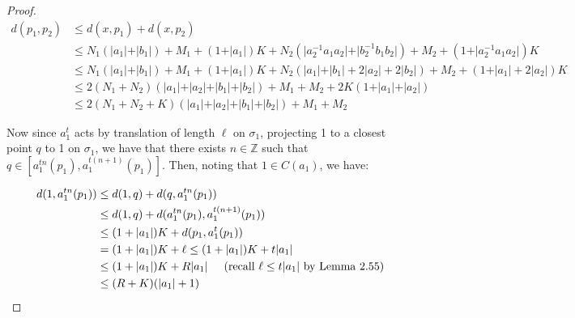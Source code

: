 \documentclass[12pt]{article}
\newcommand{\vs}{\vskip10pt}
\begin{document}
\begin{proof}
		\begin{align*}
		d(p_1, p_2) &\leq d(x, p_1) + d(x, p_2) \\
		&\leq N_1 (\vert a_1 \vert + \vert b_1 \vert) + M_1 + (1 + \vert a_1 \vert)K + N_2 (\vert a_2^{-1} a_1 a_2 \vert + \vert b_2^{-1} b_1 b_2 \vert) + M_2 + (1 + \vert a_2 ^{-1} a_1 a_2 \vert)K \\
		&\leq N_1 (\vert a_1 \vert + \vert b_1 \vert) + M_1 + (1 + \vert a_1 \vert)K + N_2 (\vert a_1 \vert + \vert b_1 \vert + 2 \vert a_2 \vert + 2 \vert b_2 \vert) + M_2 + (1 + \vert a_1 \vert + 2 \vert a_2 \vert)K \\
		&\leq 2(N_1 + N_2) (\vert a_1 \vert + \vert a_2 \vert + \vert b_1 \vert + \vert b_2 \vert) + M_1 + M_2 + 2K(1 + \vert a_1 \vert + \vert a_2 \vert) \\
		&\leq 2(N_1 + N_2 + K) (\vert a_1 \vert + \vert a_2 \vert + \vert b_1 \vert + \vert b_2 \vert) + M_1 + M_2 
		\end{align*}
		
		
		\vs 
		
		Now since $a_1^t$ acts by translation of length $\ell$ on $\sigma_1$, projecting 1 to a closest point $q$ to 1 on $\sigma_1$, we have that there exists $n \in \mathbb{Z}$ such that $q \in [a_1^{tn} (p_1), a_1^{t(n+1)} (p_1)]$. Then, noting that $1 \in C(a_1)$, we have:
		
		\begin{align*}
		d(1, a_1^{tn}(p_1)) &\leq d(1, q) + d(q, a_1^{tn}(p_1)) \\
		&\leq d(1, q) + d(a_1^{tn} (p_1), a_1^{t(n+1)} (p_1)) \\
		&\leq (1 + \vert a_1 \vert)K + d(p_1, a_1^t (p_1)) \\
		&= (1 + \vert a_1 \vert)K + \ell \leq (1 + \vert a_1 \vert)K + t \vert a_1 \vert \\
		&\leq (1 + \vert a_1 \vert)K + R \vert a_1 \vert \hspace{0.5cm} (\text{recall } \ell \leq t \vert a_1 \vert \text{ by Lemma 2.55}) \\
		&\leq (R + K) (\vert a_1 \vert + 1)
		\end{align*}
		

\end{proof}
\end{document}
